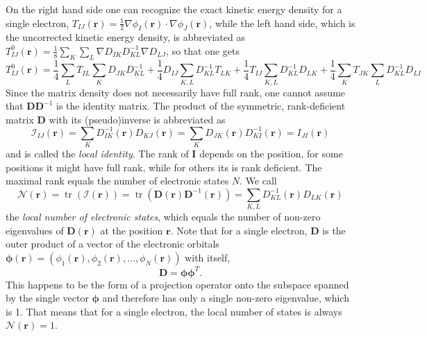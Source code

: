 \documentclass[journal=jacsat,manuscript=article]{achemso}
\DeclareMathOperator{\tr}{tr}
\newcommand\m[1]{\mathbf{#1}}
\renewcommand\vec[1]{\mathbf{#1}}
\begin{document}
On the right hand side one can recognize the exact kinetic energy density for a single electron, $T_{IJ}(\vec{r}) = \frac{1}{2} \nabla \phi_I(\vec{r}) \cdot \nabla \phi_J(\vec{r})$, while the left hand side, which is the uncorrected kinetic energy density, is abbreviated as $T^{0}_{IJ}(\vec{r}) = \frac{1}{8} \sum_K \sum_L \nabla D_{IK} D^{-1}_{KL} \nabla D_{LJ}$, so that one gets
\begin{equation}
T^{0}_{IJ}(\vec{r}) = \frac{1}{4} \sum_{L} T_{IL} \sum_K D_{JK} D^{-1}_{KL} + \frac{1}{4} D_{IJ} \sum_{K,L} D^{-1}_{KL} T_{LK} + \frac{1}{4} T_{IJ} \sum_{K,L} D^{-1}_{KL} D_{LK} + \frac{1}{4} \sum_K T_{JK} \sum_L D^{-1}_{KL} D_{LI} \label{eqn:T0_for_one_electron}
\end{equation}
Since the matrix density does not necessarily have full rank, one cannot assume that $\m{D} \m{D}^{-1}$ is the identity matrix. The product of the symmetric, rank-deficient matrix $\m{D}$ with its (pseudo)inverse is abbreviated as
\begin{equation}
\mathcal{I}_{IJ}(\vec{r}) = \sum_{K} D^{-1}_{IK}(\vec{r}) D_{KJ}(\vec{r}) = \sum_{K} D_{JK}(\vec{r}) D^{-1}_{KI}(\vec{r}) = I_{JI}(\vec{r}) \label{eqn:local_identity}
\end{equation}
and is called the \emph{local identity}.
The rank of $\m{I}$ depends on the position, for some positions it might have full rank, while for others its is rank deficient. The maximal rank equals the number of electronic states $N$. We call
\begin{equation}
 \mathcal{N}(\vec{r}) = \tr(\mathcal{I}(\vec{r})) = \tr(\m{D}(\vec{r}) \m{D}^{-1}(\vec{r})) = \sum_{K,L} D^{-1}_{KL}(\vec{r}) D_{LK}(\vec{r}) \label{eqn:local_number_of_states}
\end{equation}
the \emph{local number of electronic states}, which equals the number of non-zero eigenvalues of $\m{D}(\vec{r})$ at the position $\vec{r}$. Note that for a single electron, $\m{D}$ is the outer product of a vector of the electronic orbitals $\vec{\phi}(\vec{r}) = (\phi_1(\vec{r}), \phi_2(\vec{r}), \ldots, \phi_N(\vec{r}))$ with itself,
\begin{equation}
 \m{D} = \vec{\phi} \vec{\phi}^T.
\end{equation}
This happens to be the form of a projection operator onto the subspace spanned by the single vector $\vec{\phi}$
and therefore has only a single non-zero eigenvalue, which is 1.
That means that for a single electron, the local number of states is always $\mathcal{N}(\vec{r}) = 1$.
\end{document}
